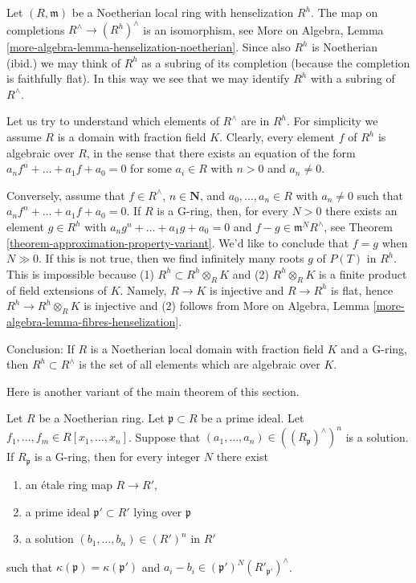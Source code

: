 \begin{example}
\label{example-describe-henselian}
Let $(R, \mathfrak m)$ be a Noetherian local ring with henselization $R^h$.
The map on completions $R^\wedge \to (R^h)^\wedge$ is an isomorphism, see
More on Algebra, Lemma \ref{more-algebra-lemma-henselization-noetherian}.
Since also $R^h$ is Noetherian (ibid.) we may think of $R^h$ as a subring
of its completion (because the completion is faithfully flat). In this way
we see that we may identify $R^h$ with a subring of $R^\wedge$.

\medskip\noindent
Let us try to understand which elements of $R^\wedge$ are in $R^h$. For
simplicity we assume $R$ is a domain with fraction field $K$. Clearly,
every element $f$ of $R^h$ is algebraic over $R$, in the sense that
there exists an equation of the form $a_n f^n + \ldots + a_1 f + a_0 = 0$
for some $a_i \in R$ with $n > 0$ and $a_n \not = 0$.

\medskip\noindent
Conversely, assume that $f \in R^\wedge$, $n \in \mathbf{N}$, and
$a_0, \ldots, a_n \in R$ with $a_n \not = 0$ such that
$a_n f^n + \ldots + a_1 f + a_0 = 0$. If $R$ is a G-ring, then, for
every $N > 0$ there exists an element $g \in R^h$ with
$a_n g^n + \ldots + a_1 g + a_0 = 0$ and $f - g \in \mathfrak m^N R^\wedge$,
see Theorem \ref{theorem-approximation-property-variant}.
We'd like to conclude that $f = g$ when $N \gg 0$.
If this is not true, then we find infinitely many roots $g$ of $P(T)$
in $R^h$. This is impossible because (1) $R^h \subset R^h \otimes_R K$
and (2) $R^h \otimes_R K$ is a finite product of field extensions of $K$.
Namely, $R \to K$ is injective and $R \to R^h$ is flat, hence
$R^h \to R^h \otimes_R K$ is injective and (2) follows from
More on Algebra, Lemma \ref{more-algebra-lemma-fibres-henselization}.

\medskip\noindent
Conclusion: If $R$ is a Noetherian local domain with fraction field $K$
and a G-ring, then $R^h \subset R^\wedge$ is the set of all elements which
are algebraic over $K$.
\end{example}

\noindent
Here is another variant of the main theorem of this section.

\begin{lemma}
\label{lemma-approximation-property-variant}
Let $R$ be a Noetherian ring. Let $\mathfrak p \subset R$ be a prime ideal. Let
$f_1, \ldots, f_m \in R[x_1, \ldots, x_n]$.
Suppose that $(a_1, \ldots, a_n) \in ((R_\mathfrak p)^\wedge)^n$ is a solution.
If $R_\mathfrak p$ is a G-ring, then for every integer $N$ there exist
\begin{enumerate}
\item an \'etale ring map $R \to R'$,
\item a prime ideal $\mathfrak p' \subset R'$ lying over $\mathfrak p$
\item a solution $(b_1, \ldots, b_n) \in (R')^n$ in $R'$
\end{enumerate}
such that $\kappa(\mathfrak p) = \kappa(\mathfrak p')$ and
$a_i - b_i \in (\mathfrak p')^N(R'_{\mathfrak p'})^\wedge$.
\end{lemma}

